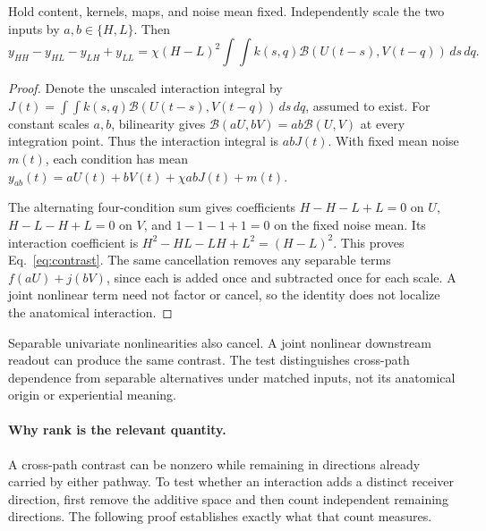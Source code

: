 \documentclass[submission,nolinenumbers]{esj}
\newcommand{\Bmap}{\mathcal{B}}
\begin{document}
\begin{proposition}\label{prop:contrast}
Hold content, kernels, maps, and noise mean fixed. Independently scale the two inputs by $a,b\in\{H,L\}$. Then
\begin{equation}
y_{HH}-y_{HL}-y_{LH}+y_{LL}
=\chi(H-L)^2\int\!\int k(s,q)\Bmap(U(t-s),V(t-q))\,ds\,dq.\label{eq:contrast}
\end{equation}
\end{proposition}
\begin{proof}
Denote the unscaled interaction integral by $J(t)=\int\!\int k(s,q)\Bmap(U(t-s),V(t-q))\,ds\,dq$, assumed to exist. For constant scales $a,b$, bilinearity gives $\Bmap(aU,bV)=ab\Bmap(U,V)$ at every integration point. Thus the interaction integral is $abJ(t)$. With fixed mean noise $m(t)$, each condition has mean $y_{ab}(t)=aU(t)+bV(t)+\chi abJ(t)+m(t)$.

The alternating four-condition sum gives coefficients $H-H-L+L=0$ on $U$, $H-L-H+L=0$ on $V$, and $1-1-1+1=0$ on the fixed noise mean. Its interaction coefficient is $H^2-HL-LH+L^2=(H-L)^2$. This proves Eq.~\eqref{eq:contrast}. The same cancellation removes any separable terms $f(aU)+j(bV)$, since each is added once and subtracted once for each scale. A joint nonlinear term need not factor or cancel, so the identity does not localize the anatomical interaction.
\end{proof}
Separable univariate nonlinearities also cancel. A joint nonlinear downstream readout can produce the same contrast. The test distinguishes cross-path dependence from separable alternatives under matched inputs, not its anatomical origin or experiential meaning.

\paragraph{Why rank is the relevant quantity.} A cross-path contrast can be nonzero while remaining in directions already carried by either pathway. To test whether an interaction adds a distinct receiver direction, first remove the additive space and then count independent remaining directions. The following proof establishes exactly what that count measures.
\end{document}
